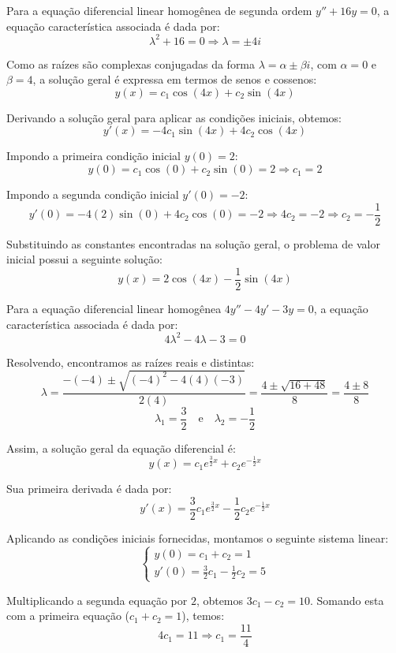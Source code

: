 \documentclass[oneside,12pt,a4paper]{report}
\begin{document}
\begin{resolucao}
    \itemresolucao Para a equação diferencial linear homogênea de segunda ordem $y'' + 16y = 0$, a equação característica associada é dada por:
    \[\lambda^2 + 16 = 0 \Rightarrow \lambda = \pm 4i\]

    Como as raízes são complexas conjugadas da forma $\lambda = \alpha \pm \beta i$, com $\alpha = 0$ e $\beta = 4$, a solução geral é expressa em termos de senos e cossenos:
    \[y(x) = c_1 \cos(4x) + c_2 \sin(4x)\]

    Derivando a solução geral para aplicar as condições iniciais, obtemos:
    \[y'(x) = -4c_1 \sin(4x) + 4c_2 \cos(4x)\]

    Impondo a primeira condição inicial $y(0) = 2$:
    \[y(0) = c_1 \cos(0) + c_2 \sin(0) = 2 \Rightarrow c_1 = 2\]

    Impondo a segunda condição inicial $y'(0) = -2$:
    \[y'(0) = -4(2)\sin(0) + 4c_2 \cos(0) = -2 \Rightarrow 4c_2 = -2 \Rightarrow c_2 = -\frac{1}{2}\]

    Substituindo as constantes encontradas na solução geral, o problema de valor inicial possui a seguinte solução:
    \[\boxed{y(x) = 2 \cos(4x) - \frac{1}{2} \sin(4x)}\]

    \itemresolucao Para a equação diferencial linear homogênea $4y'' - 4y' - 3y = 0$, a equação característica associada é dada por:
    \[4\lambda^2 - 4\lambda - 3 = 0\]

    Resolvendo, encontramos as raízes reais e distintas:
    \[\lambda = \frac{-(-4) \pm \sqrt{(-4)^2 - 4(4)(-3)}}{2(4)} = \frac{4 \pm \sqrt{16 + 48}}{8} = \frac{4 \pm 8}{8}\]
    \[\lambda_1 = \frac{3}{2} \quad \text{e} \quad \lambda_2 = -\frac{1}{2}\]

    Assim, a solução geral da equação diferencial é:
    \[y(x) = c_1 e^{\frac{3}{2}x} + c_2 e^{-\frac{1}{2}x}\]

    Sua primeira derivada é dada por:
    \[y'(x) = \frac{3}{2}c_1 e^{\frac{3}{2}x} - \frac{1}{2}c_2 e^{-\frac{1}{2}x}\]

    Aplicando as condições iniciais fornecidas, montamos o seguinte sistema linear:
    \[\begin{cases}
        y(0) = c_1 + c_2 = 1 \\
        y'(0) = \frac{3}{2}c_1 - \frac{1}{2}c_2 = 5
    \end{cases}\]

    Multiplicando a segunda equação por $2$, obtemos $3c_1 - c_2 = 10$. Somando esta com a primeira equação ($c_1 + c_2 = 1$), temos:
    \[4c_1 = 11 \Rightarrow c_1 = \frac{11}{4}\]


\end{resolucao}
\end{document}
